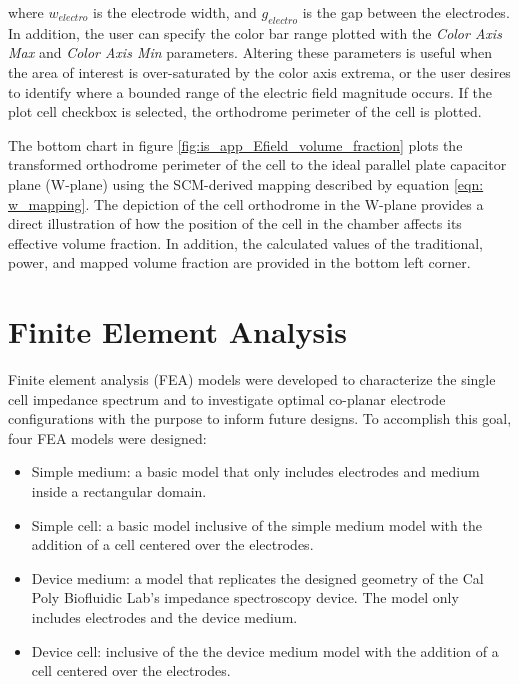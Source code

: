 where $w_{electro}$ is the electrode width, and $g_{electro}$ is the gap between the electrodes. In addition, the user can specify the color bar range plotted with the \textit{Color Axis Max} and \textit{Color Axis Min} parameters. Altering these parameters is useful when the area of interest is over-saturated by the color axis extrema, or the user desires to identify where a bounded range of the electric field magnitude occurs. If the plot cell checkbox is selected, the orthodrome perimeter of the cell is plotted.

\par The bottom chart in figure \ref{fig:is_app_Efield_volume_fraction} plots the transformed orthodrome perimeter of the cell to the ideal parallel plate capacitor plane (W-plane) using the SCM-derived mapping described by equation \ref{eqn: w_mapping}. The depiction of the cell orthodrome in the W-plane provides a direct illustration of how the position of the cell in the chamber affects its effective volume fraction. In addition, the calculated values of the traditional, power, and mapped volume fraction are provided in the bottom left corner. 

    


\section{Finite Element Analysis}
\label{sec: FEA}

\par Finite element analysis (FEA) models were developed to characterize the single cell impedance spectrum and to investigate optimal co-planar electrode configurations with the purpose to inform future designs. To accomplish this goal, four FEA models were designed:

\begin{itemize}
    \item Simple medium: a basic model that only includes electrodes and medium inside a rectangular domain.
    \item Simple cell: a basic model inclusive of the simple medium model with the addition of a cell centered over the electrodes.
    \item Device medium: a model that replicates the designed geometry of the Cal Poly Biofluidic Lab's impedance spectroscopy device. The model only includes electrodes and the device medium.   
    \item Device cell: inclusive of the the device medium model with the addition of a cell centered over the electrodes. 
\end{itemize}

